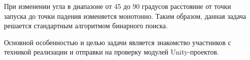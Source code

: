 \solutionSection

При изменении угла в диапазоне от 45 до 90 градусов расстояние от точки запуска до точки падения изменяется монотонно. Таким образом, данная задача решается стандартным алгоритмом бинарного поиска.
 
Основной особенностью и целью задачи является знакомство участников с техникой реализации и отправки на проверку модулей Unity-проектов.

\codeExample

